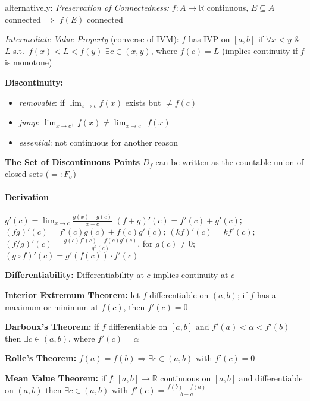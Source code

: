 \documentclass[8pt,twoside]{extarticle}
\begin{document}
\begin{multicols}{2}
 alternatively: \textit{Preservation of Connectedness:} $f:A\to \mathbb{R}$ continuous, $E\subseteq A$ connected $\Rightarrow$ $f(E)$ connected

 \textit{Intermediate Value Property} (converse of IVM): $f$ has IVP on $\left[a,b\right]$ if $\forall x<y$ \& $L$ s.t.\ $f(x)<L<f(y)$ $\exists c\in(x,y)$, where $f(c)=L$ (implies continuity if $f$ is monotone)
 
 \textbf{Discontinuity:} 
 
 \vspace{-1.4em}
 \begin{itemize}[itemsep=0em, topsep=0pt, partopsep=0pt,parsep=0pt, leftmargin=8.5em]
 \item \textit{removable}: if $\lim_{x\to c}f(x)$ exists but $\neq f(c)$
 \item \textit{jump}: $\lim_{x\to c^+}f(x) \neq \lim_{x\to c^-}f(x)$ 
 \item \textit{essential}: not continuous for another reason
 \end{itemize}
 
 \textbf{The Set of Discontinuous Points} $D_f$  can be written as the countable union of closed sets ($ =: F_\sigma$)



\paragraph{Derivation} $g'(c)=\lim_{x\to c} \frac{g(x)-g(c)}{x-c}$ \newline
$(f{+}g)'(c) = f'(c) {+} g'(c)$; \,\,\, $(fg)'(c)=f'(c)g(c) {+} f(c)g'(c)$; $(kf)'(c) = kf'(c)$; \,\,\, $(f/g)'(c) =\frac{g(c)f'(c)-f(c)g'(c)}{g^2(c)}$, for $g(c)\neq 0$; 
$(g\circ f)'(c)=g'(f(c))\cdot f'(c)$


\textbf{Differentiability:} Differentiability at $c$ implies continuity at $c$

\textbf{Interior Extremum Theorem:} let $f$ differentiable on $(a,b)$; if $f$ has a maximum or minimum at $f(c)$, then $f'(c)=0$


\textbf{Darboux's Theorem:} if $f$ differentiable on $\left[a,b\right]$ and $f'(a)<\alpha<f'(b)$ then $\exists c\in (a,b)$, where $f'(c)=\alpha$


\textbf{Rolle's Theorem:} $f(a)=f(b) \Rightarrow \exists c\in (a,b)$ with $f'(c)=0$

\textbf{Mean Value Theorem:} if $f:[a,b]\to\mathbb{R}$ continuous on $[a,b]$ and differentiable on $(a,b)$ then $\exists c\in(a,b)$ with $f'(c)=\frac{f(b)-f(a)}{b-a}$


\end{multicols}
\end{document}

